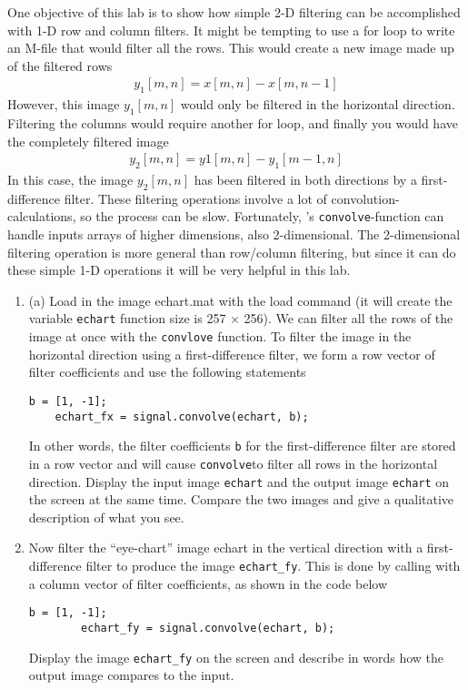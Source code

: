 One objective of this lab is to show how simple 2-D filtering can be accomplished with 1-D row and column filters. It might be tempting to use a for loop to write an M-file that would filter all the rows. This would create a new image made up of the filtered rows
\begin{align}
	y_1[m,n] = x[m,n] - x[m,n-1]
\end{align}
However, this image $y_1[m, n]$ would only be filtered in the horizontal direction. Filtering the columns would require another for loop, and finally you would have the completely filtered image
\begin{align}
	y_2[m,n] = y1[m,n] - y_1[m-1, n]	
\end{align}
In this case, the image $y_2[m,n]$ has been filtered in both directions by a first-difference filter.
These filtering operations involve a lot of convolution-calculations, so the process can be slow. Fortunately, \scipy's \verb|convolve|-function can handle inputs arrays of higher dimensions, also 2-dimensional.
The 2-dimensional filtering operation is more general than row/column filtering, but since it can do these simple 1-D operations it will be very helpful in this lab.
\begin{enumerate}[1)]
\item (a) Load in the image echart.mat with the load command (it will create the variable \verb|echart|  function size is 257 × 256).
	 We can filter all the rows of the image at once with the \verb|convlove| function. 
	To filter the image in the horizontal direction using a first-difference filter, we form a row vector of filter 	coefficients and use the following statements
	\begin{lstlisting}[style=pythonstyle]
	b = [1, -1];
	echart_fx = signal.convolve(echart, b);
	\end{lstlisting}
	In other words, the filter coefficients \verb|b| for the first-difference filter are stored in a row vector and will cause \verb|convolve|to filter all rows in the horizontal direction. Display the input image \verb|echart| and the output image \verb|echart| on the screen at the same time. Compare the two images and give
	a qualitative description of what you see.
	
\item  Now filter the “eye-chart” image echart in the vertical direction with a first-difference filter to produce the image \verb|echart_fy|. 
	This is done by calling with a column vector of filter coefficients, as shown in the code below
		\begin{lstlisting}[style=pythonstyle]
		b = [1, -1];
		echart_fy = signal.convolve(echart, b);
	\end{lstlisting}
	Display the image \verb|echart_fy| on the screen and describe in words how the output image compares to the input.	
\end{enumerate}


